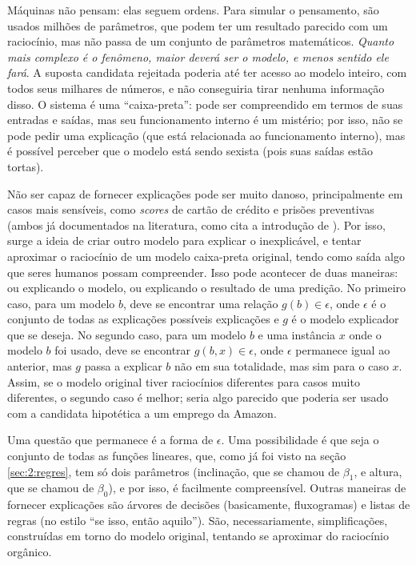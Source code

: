 Máquinas não pensam: elas seguem ordens.
Para simular o pensamento, são usados milhões de parâmetros, que podem ter um resultado parecido com um raciocínio, mas não passa de um conjunto de parâmetros matemáticos.
\textit{Quanto mais complexo é o fenômeno, maior deverá ser o modelo, e menos sentido ele fará}.
A suposta candidata rejeitada poderia até ter acesso ao modelo inteiro, com todos seus milhares de números, e não conseguiria tirar nenhuma informação disso.
O sistema é uma ``caixa-preta'': pode ser compreendido em termos de suas entradas e saídas, mas seu funcionamento interno é um mistério; por isso, não se pode pedir uma explicação (que está relacionada ao funcionamento interno), mas é possível perceber que o modelo está sendo sexista (pois suas saídas estão tortas).

Não ser capaz de fornecer explicações pode ser muito danoso, principalmente em casos mais sensíveis, como \textit{scores} de cartão de crédito e prisões preventivas (ambos já documentados na literatura, como cita a introdução de \textcite{aïvodji_fairwashing_2019}).
Por isso, surge a ideia de criar outro modelo para explicar o inexplicável, e tentar aproximar o raciocínio de um modelo caixa-preta original, tendo como saída algo que seres humanos possam compreender.
Isso pode acontecer de duas maneiras: ou explicando o modelo, ou explicando o resultado de uma predição.
No primeiro caso, para um modelo $b$, deve se encontrar uma relação $g(b) \in \epsilon$, onde $\epsilon$ é o conjunto de todas as explicações possíveis explicações e $g$ é o modelo explicador que se deseja.
No segundo caso, para um modelo $b$ e uma instância $x$ onde o modelo $b$ foi usado, deve se encontrar $g(b, x) \in \epsilon$, onde $\epsilon$ permanece igual ao anterior, mas $g$ passa a explicar $b$ não em sua totalidade, mas sim para o caso $x$.
Assim, se o modelo original tiver raciocínios diferentes para casos muito diferentes, o segundo caso é melhor; seria algo parecido que poderia ser usado com a candidata hipotética a um emprego da Amazon.

Uma questão que permanece é a forma de $\epsilon$.
Uma possibilidade é que seja o conjunto de todas as funções lineares, que, como já foi visto na seção \ref{sec:2:regres}, tem só dois parâmetros (inclinação, que se chamou de $\beta_1$, e altura, que se chamou de $\beta_0$), e por isso, é facilmente compreensível.
Outras maneiras de fornecer explicações são árvores de decisões (basicamente, fluxogramas) e listas de regras (no estilo ``se isso, então aquilo'').
São, necessariamente, simplificações, construídas em torno do modelo original, tentando se aproximar do raciocínio orgânico.

